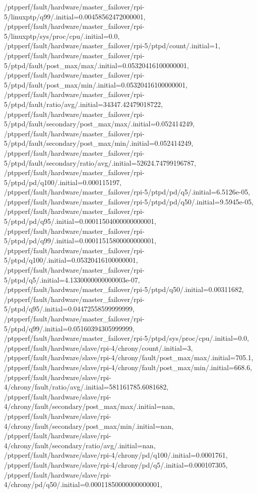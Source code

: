 {    /ptpperf/fault/hardware/master_failover/rpi-5/linuxptp/q99/.initial=0.00458562472000001,
    /ptpperf/fault/hardware/master_failover/rpi-5/linuxptp/sys/proc/cpu/.initial=0.0,
    /ptpperf/fault/hardware/master_failover/rpi-5/ptpd/count/.initial=1,
    /ptpperf/fault/hardware/master_failover/rpi-5/ptpd/fault/post_max/max/.initial=0.05320416100000001,
    /ptpperf/fault/hardware/master_failover/rpi-5/ptpd/fault/post_max/min/.initial=0.05320416100000001,
    /ptpperf/fault/hardware/master_failover/rpi-5/ptpd/fault/ratio/avg/.initial=34347.42479018722,
    /ptpperf/fault/hardware/master_failover/rpi-5/ptpd/fault/secondary/post_max/max/.initial=0.052414249,
    /ptpperf/fault/hardware/master_failover/rpi-5/ptpd/fault/secondary/post_max/min/.initial=0.052414249,
    /ptpperf/fault/hardware/master_failover/rpi-5/ptpd/fault/secondary/ratio/avg/.initial=52624.74799196787,
    /ptpperf/fault/hardware/master_failover/rpi-5/ptpd/pd/q100/.initial=0.000115197,
    /ptpperf/fault/hardware/master_failover/rpi-5/ptpd/pd/q5/.initial=6.5126e-05,
    /ptpperf/fault/hardware/master_failover/rpi-5/ptpd/pd/q50/.initial=9.5945e-05,
    /ptpperf/fault/hardware/master_failover/rpi-5/ptpd/pd/q95/.initial=0.00011504000000000001,
    /ptpperf/fault/hardware/master_failover/rpi-5/ptpd/pd/q99/.initial=0.00011515800000000001,
    /ptpperf/fault/hardware/master_failover/rpi-5/ptpd/q100/.initial=0.05320416100000001,
    /ptpperf/fault/hardware/master_failover/rpi-5/ptpd/q5/.initial=4.1330000000000003e-07,
    /ptpperf/fault/hardware/master_failover/rpi-5/ptpd/q50/.initial=0.00311682,
    /ptpperf/fault/hardware/master_failover/rpi-5/ptpd/q95/.initial=0.04472558599999999,
    /ptpperf/fault/hardware/master_failover/rpi-5/ptpd/q99/.initial=0.05160394305999999,
    /ptpperf/fault/hardware/master_failover/rpi-5/ptpd/sys/proc/cpu/.initial=0.0,
    /ptpperf/fault/hardware/slave/rpi-4/chrony/count/.initial=3,
    /ptpperf/fault/hardware/slave/rpi-4/chrony/fault/post_max/max/.initial=705.1,
    /ptpperf/fault/hardware/slave/rpi-4/chrony/fault/post_max/min/.initial=668.6,
    /ptpperf/fault/hardware/slave/rpi-4/chrony/fault/ratio/avg/.initial=581161785.6081682,
    /ptpperf/fault/hardware/slave/rpi-4/chrony/fault/secondary/post_max/max/.initial=nan,
    /ptpperf/fault/hardware/slave/rpi-4/chrony/fault/secondary/post_max/min/.initial=nan,
    /ptpperf/fault/hardware/slave/rpi-4/chrony/fault/secondary/ratio/avg/.initial=nan,
    /ptpperf/fault/hardware/slave/rpi-4/chrony/pd/q100/.initial=0.0001761,
    /ptpperf/fault/hardware/slave/rpi-4/chrony/pd/q5/.initial=0.000107305,
    /ptpperf/fault/hardware/slave/rpi-4/chrony/pd/q50/.initial=0.00011850000000000001,
}
